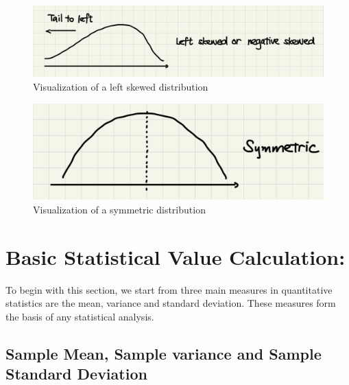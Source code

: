 \begin{figure}[H]
	\centering
	\includegraphics[scale=0.25]{Section1/img/LeftSkewed.jpg}
	\caption{Visualization of a left skewed distribution}
\end{figure}

\begin{figure}[H]
	\centering
	\includegraphics[scale=0.25]{Section1/img/Symmetric.jpg}
	\caption{Visualization of a symmetric distribution}
\end{figure}

\section{Basic Statistical Value Calculation:}

To begin with this section, we start from three main measures in quantitative statistics are the mean, variance and standard deviation. These measures form the basis of any statistical analysis.\\

\subsection{Sample Mean, Sample variance and Sample Standard Deviation}


